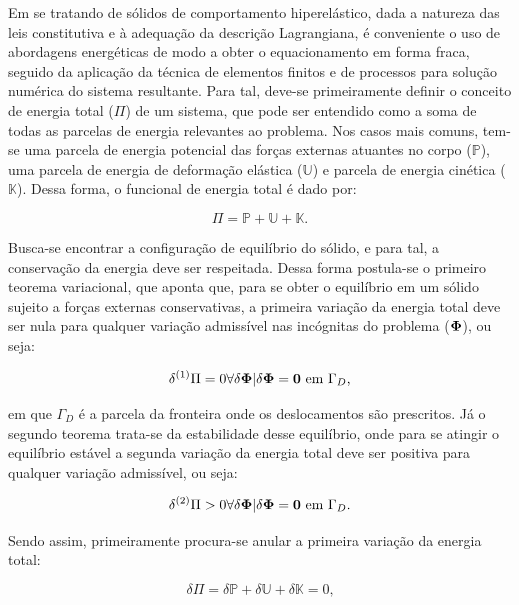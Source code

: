 Em se tratando de sólidos de comportamento hiperelástico, dada a natureza das leis constitutiva e à adequação da descrição Lagrangiana, é conveniente o uso de abordagens energéticas de modo a obter o equacionamento em forma fraca, seguido da aplicação da técnica de elementos finitos e de processos para solução numérica do sistema resultante. Para tal, deve-se primeiramente definir o conceito de energia total ($\Pi$) de um sistema, que pode ser entendido como a soma de todas as parcelas de energia relevantes ao problema. Nos casos mais comuns, tem-se uma parcela de energia potencial das forças externas atuantes no corpo ($\mathbb{P}$), uma parcela de energia de deformação elástica ($\mathbb{U}$) e parcela de energia cinética ($\mathbb{K}$). Dessa forma, o funcional de energia total é dado por:

\begin{equation}
    \Pi=\mathbb{P}+\mathbb{U}+\mathbb{K}\text{.}
    \label{FuncionalEnergia}
\end{equation}

Busca-se encontrar a configuração de equilíbrio do sólido, e para tal, a conservação da energia deve ser respeitada. Dessa forma postula-se o primeiro teorema variacional, que aponta que, para se obter o equilíbrio em um sólido sujeito a forças externas conservativas, a primeira variação da energia total deve ser nula para qualquer variação admissível nas incógnitas do problema ($\boldsymbol{\Phi}$), ou seja:

\begin{equation}
    \delta^{(1)}\Pi=0\forall\delta\boldsymbol{\Phi}|\delta\boldsymbol{\Phi}=\boldsymbol{0}\text{ em }\Gamma_D\text{,}
\end{equation}

\noindent em que $\Gamma_D$ é a parcela da fronteira onde os deslocamentos são prescritos. Já o segundo teorema trata-se da estabilidade desse equilíbrio, onde para se atingir o equilíbrio estável a segunda variação da energia total deve ser positiva para qualquer variação admissível, ou seja:

\begin{equation}
    \delta^{(2)}\Pi>0\forall\delta\boldsymbol{\Phi}|\delta\boldsymbol{\Phi}=\boldsymbol{0}\text{ em }\Gamma_D\text{.}
\end{equation}

Sendo assim, primeiramente procura-se anular a primeira variação da energia total:

\begin{equation}
    \delta\Pi=\delta\mathbb{P}+\delta\mathbb{U}+\delta\mathbb{K}=0\text{,}
\end{equation}

